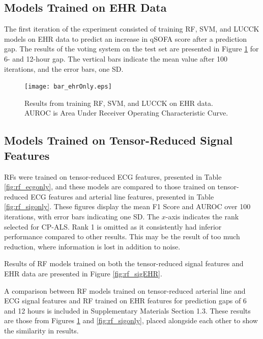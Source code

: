 \subsection{Models Trained on EHR Data}
The first iteration of the experiment consisted of training RF, SVM, and LUCCK models on EHR data to predict an increase in qSOFA score after a prediction gap. The results of the voting system on the test set are presented in Figure \ref{fig:ehrOnly} for 6- and 12-hour gap. The vertical bars indicate the mean value after 100 iterations, and the error bars, one SD.

\begin{figure}[htb]
    \centering
    \texttt{[image: bar\_ehrOnly.eps]} 
    \caption{Results from training RF, SVM, and LUCCK on EHR data. AUROC is Area Under Receiver Operating Characteristic Curve.}
    \label{fig:ehrOnly}
\end{figure}

\subsection{Models Trained on Tensor-Reduced Signal Features}
RFs were trained on tensor-reduced ECG features, presented in Table \ref{fig:rf_ecgonly}, and these models are compared to those trained on tensor-reduced ECG features and arterial line features, presented in Table \ref{fig:rf_sigonly}. These figures display the mean F1 Score and AUROC over 100 iterations, with error bars indicating one SD. The $x$-axis indicates the rank selected for CP-ALS. Rank 1 is omitted as it consistently had inferior performance compared to other results. This may be the result of too much reduction, where information is lost in addition to noise.

Results of RF models trained on both the tensor-reduced signal features and EHR data are presented in Figure \ref{fig:rf_sigEHR}.

A comparison between RF models trained on tensor-reduced arterial line and ECG signal features and RF trained on EHR features for prediction gaps of 6 and 12 hours is included in Supplementary Materials Section 1.3. These results are those from Figures \ref{fig:ehrOnly} and \ref{fig:rf_sigonly}, placed alongside each other to show the similarity in results.

